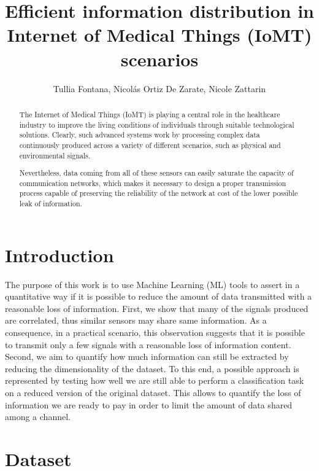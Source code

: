 \documentclass[10pt, a4paper, twocolumn]{article}
\title{Efficient information distribution in Internet of Medical Things (IoMT) scenarios} %
\author{Tullia Fontana, Nicolás Ortiz De Zarate, Nicole Zattarin}
\date{}
\theoremstyle{definition}
\begin{document}
\maketitle

\begin{abstract}
The Internet of Medical Things (IoMT) is playing a central role in the healthcare industry to improve the living conditions of individuals through suitable technological solutions. Clearly, such advanced systems work by processing complex data continuously produced across a variety of different scenarios, such as physical and environmental signals. \par 
Nevertheless, data coming from all of these sensors can easily saturate the capacity of communication networks, which makes it necessary to design a proper transmission process capable of preserving the reliability of the network at cost of the lower possible leak of information.
\end{abstract}

\section{Introduction}
The purpose of this work is to use Machine Learning (ML) tools to assert in a quantitative way if it is possible to reduce the amount of data transmitted with a reasonable loss of information. First, we show that many of the signals produced are correlated, thus similar sensors may share same information. As a consequence, in a practical scenario, this observation suggests that it is possible to transmit only a few signals with a reasonable loss of information content. Second, we aim to quantify how much information can still be extracted by reducing the dimensionality of the dataset. To this end, a possible approach is represented by testing how well we are still able to perform a classification task on a reduced version of the original dataset. This allows to quantify the loss of information we are ready to pay in order to limit the amount of data shared among a channel.

\section{Dataset}
\end{document}
